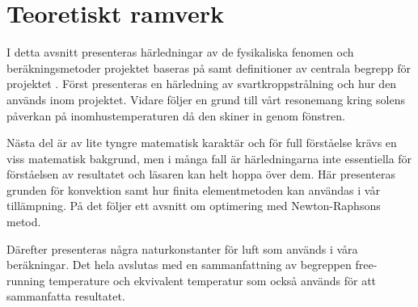\chapter{Teoretiskt ramverk}

I detta avsnitt presenteras härledningar av de fysikaliska fenomen och beräkningsmetoder projektet baseras på samt definitioner av centrala begrepp för projektet . Först presenteras en härledning av svartkroppstrålning och hur den används inom projektet. Vidare följer en grund till vårt resonemang kring solens påverkan på inomhustemperaturen då den skiner in genom fönstren.

Nästa del är av lite tyngre matematisk karaktär och för full förståelse krävs en viss matematisk bakgrund, men i många fall är härledningarna inte essentiella för förståelsen av resultatet och läsaren kan helt hoppa över dem. Här presenteras grunden för konvektion samt hur finita elementmetoden kan användas i vår tillämpning. På det följer ett avsnitt om optimering med Newton-Raphsons metod. 

Därefter presenteras några naturkonstanter för luft som används i våra beräkningar. Det hela avslutas med en sammanfattning av begreppen free-running temperature och ekvivalent temperatur som också används för att sammanfatta resultatet.












